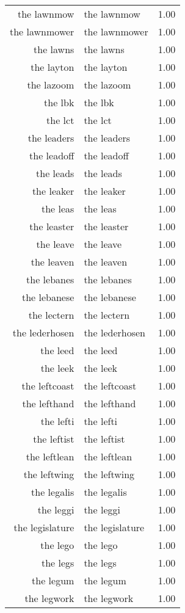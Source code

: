 \begin{table}[ht]
\begin{tabular}{rlr}
  the lawnmow & the lawnmow & 1.00 \\ 
  the lawnmower & the lawnmower & 1.00 \\ 
  the lawns & the lawns & 1.00 \\ 
  the layton & the layton & 1.00 \\ 
  the lazoom & the lazoom & 1.00 \\ 
  the lbk & the lbk & 1.00 \\ 
  the lct & the lct & 1.00 \\ 
  the leaders & the leaders & 1.00 \\ 
  the leadoff & the leadoff & 1.00 \\ 
  the leads & the leads & 1.00 \\ 
  the leaker & the leaker & 1.00 \\ 
  the leas & the leas & 1.00 \\ 
  the leaster & the leaster & 1.00 \\ 
  the leave & the leave & 1.00 \\ 
  the leaven & the leaven & 1.00 \\ 
  the lebanes & the lebanes & 1.00 \\ 
  the lebanese & the lebanese & 1.00 \\ 
  the lectern & the lectern & 1.00 \\ 
  the lederhosen & the lederhosen & 1.00 \\ 
  the leed & the leed & 1.00 \\ 
  the leek & the leek & 1.00 \\ 
  the leftcoast & the leftcoast & 1.00 \\ 
  the lefthand & the lefthand & 1.00 \\ 
  the lefti & the lefti & 1.00 \\ 
  the leftist & the leftist & 1.00 \\ 
  the leftlean & the leftlean & 1.00 \\ 
  the leftwing & the leftwing & 1.00 \\ 
  the legalis & the legalis & 1.00 \\ 
  the leggi & the leggi & 1.00 \\ 
  the legislature & the legislature & 1.00 \\ 
  the lego & the lego & 1.00 \\ 
  the legs & the legs & 1.00 \\ 
  the legum & the legum & 1.00 \\ 
  the legwork & the legwork & 1.00 \\ 

\end{tabular}
\end{table}
